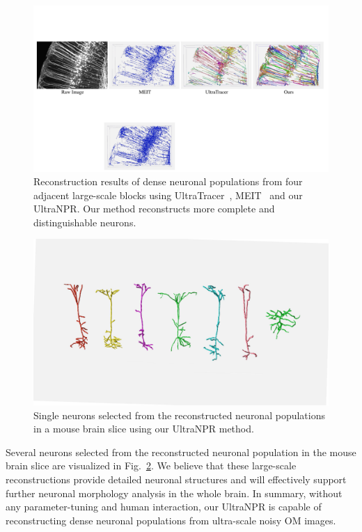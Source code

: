 \begin{figure}[t]
	\centering
	\includegraphics[width=\textwidth]{./Illustrations/comparison_ultranpr.pdf}
	\caption{Reconstruction results of dense neuronal populations from four adjacent large-scale blocks using UltraTracer~\cite{Peng2017}, MEIT~\cite{Wang2018} and our UltraNPR.  Our method reconstructs more complete and distinguishable neurons. 
	}
	\label{fig:reconstruct_blocks}
\end{figure}



\begin{figure}[t]
	\centering
	\includegraphics[width=\columnwidth]{./Illustrations/single_neurons4.pdf}
	\caption{Single neurons selected from the reconstructed neuronal populations in a mouse brain slice using our UltraNPR method.}
	\label{fig:single_neurons}
\end{figure}


Several neurons selected from the reconstructed neuronal population in the mouse brain slice are visualized in Fig.~\ref{fig:single_neurons}. 
We believe that these large-scale reconstructions provide detailed neuronal structures and will effectively support further neuronal morphology analysis in the whole brain. 
In summary, without any parameter-tuning and human interaction, our UltraNPR is capable of reconstructing dense neuronal populations from ultra-scale noisy OM images. 

